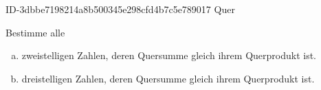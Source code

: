 \begin{exercise}
      {ID-3dbbe7198214a8b500345e298cfd4b7c5e789017}
      {Quer}
  \ifproblem\problem\par
    Bestimme alle
    \begin{enumerate}[a)]
      \item zweistelligen Zahlen, deren Quersumme gleich ihrem Querprodukt ist.
      \item dreistelligen Zahlen, deren Quersumme gleich ihrem Querprodukt ist.
    \end{enumerate}
  \fi
\end{exercise}
